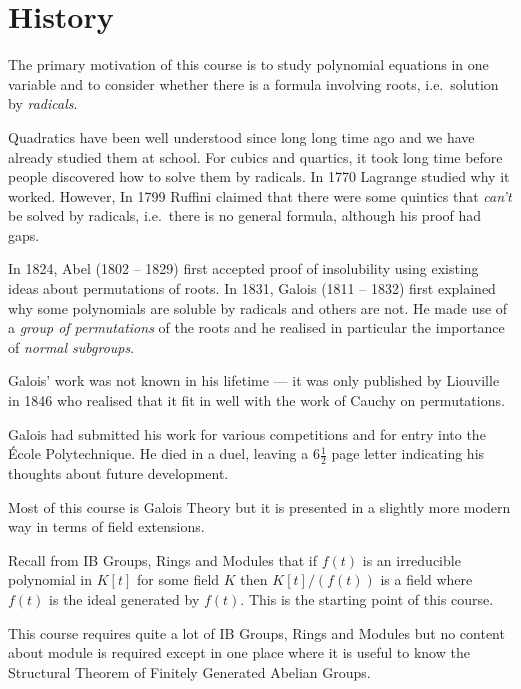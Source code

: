 \documentclass[a4paper]{article}
\begin{document}


\tableofcontents

\setcounter{section}{-1}

\section{History}

The primary motivation of this course is to study polynomial equations in one variable and to consider whether there is a formula involving roots, i.e.\ solution by \emph{radicals}.

Quadratics have been well understood since long long time ago and we have already studied them at school. For cubics and quartics, it took long time before people discovered how to solve them by radicals. In 1770 Lagrange studied why it worked. However, In 1799 Ruffini claimed that there were some quintics that \emph{can't} be solved by radicals, i.e.\ there is no general formula, although his proof had gaps.

In 1824, Abel (1802 -- 1829) first accepted proof of insolubility using existing ideas about permutations of roots. In 1831, Galois (1811 -- 1832) first explained why some polynomials are soluble by radicals and others are not. He made use of a \emph{group of permutations} of the roots and he realised in particular the importance of \emph{normal subgroups}.

Galois' work was not known in his lifetime --- it was only published by Liouville in 1846 who realised that it fit in well with the work of Cauchy on permutations.

Galois had submitted his work for various competitions and for entry into the École Polytechnique. He died in a duel, leaving a \(6\frac{1}{2}\) page letter indicating his thoughts about future development.

Most of this course is Galois Theory but it is presented in a slightly more modern way in terms of field extensions.

Recall from IB Groups, Rings and Modules that if \(f(t)\) is an irreducible polynomial in \(K[t]\) for some field \(K\) then \(K[t]/(f(t))\) is a field where \(f(t)\) is the ideal generated by \(f(t)\). This is the starting point of this course.

This course requires quite a lot of IB Groups, Rings and Modules but no content about module is required except in one place where it is useful to know the Structural Theorem of Finitely Generated Abelian Groups.
\end{document}
